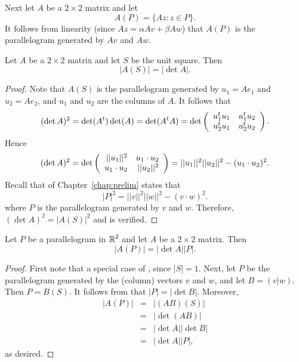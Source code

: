 \documentclass{ximera}
\begin{document}
Next let $A$ be a $2\times 2$ matrix and let
\[
A(P) = \{Az:z\in P\}.
\]
It follows from linearity (since $Az=\alpha Av+\beta Aw$) that $A(P)$ is the
parallelogram generated by $Av$ and $Aw$.

\begin{proposition}  \label{P:det&area}
Let $A$ be a $2\times 2$ matrix and let $S$ be the unit square.  Then 
\begin{equation}  \label{e:det&area2}
|A(S)| = |\det A|.
\end{equation}
\end{proposition}

\begin{proof}   Note that $A(S)$ is the parallelogram generated by $u_1=Ae_1$ and 
$u_2=Ae_2$, and $u_1$ and $u_2$ are the columns of $A$.  It follows that
\[
(\det A)^2=\det(A^t)\det(A)=\det(A^tA) =
\det\left(\begin{array}{rr} u_1^tu_1 & u_1^tu_2\\ u_2^tu_1 &u_2^tu_2\end{array}\right).
\]
Hence
\[
(\det A)^2=
\det\left(\begin{array}{rr} ||u_1||^2 & u_1\cdot u_2\\ u_1\cdot u_2 &||u_2||^2\end{array}\right) =
||u_1||^2||u_2||^2-(u_1\cdot u_2)^2.
\]
Recall that  of Chapter~\ref{chap:prelim} states that
\[
|P|^2 = ||v||^2||w||^2 - (v\cdot w)^2.
\]
where $P$ is the parallelogram generated by $v$ and $w$.  Therefore, 
$(\det A)^2 = |A(S)|^2$ and  is verified. \end{proof}


\begin{theorem}  \label{T:det&area}
Let $P$ be a parallelogram in $\mbox{$\Bbb{R}$}^2$ and let $A$ be a $2\times 2$
matrix.  Then
\begin{equation} \label{e:det&area}
|A(P)| = |\det A||P|.
\end{equation}
\end{theorem}

\begin{proof}  First note that  a special case of , 
since $|S|=1$.   Next, let $P$ be the parallelogram generated by the (column)
vectors $v$ and $w$, and let $B=(v|w)$.  Then $P=B(S)$.  It
follows from  that $|P|=|\det B|$.  Moreover,
\begin{eqnarray*}
|A(P)| & = & |(AB)(S)| \\
& = & |\det(AB)| \\
& = & |\det A||\det B| \\
& = & |\det A||P|,
\end{eqnarray*}
as desired.  \end{proof}

\EXER
\end{document}
